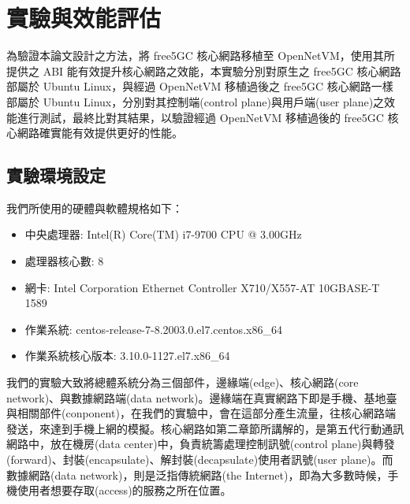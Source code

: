 \chapter{實驗與效能評估}
\label{chapter:evaluation}

為驗證本論文設計之方法，將 free5GC 核心網路移植至 OpenNetVM，使用其所提供之 ABI 能有效提升核心網路之效能，本實驗分別對原生之 free5GC 核心網路部屬於 Ubuntu Linux，與經過 OpenNetVM 移植過後之 free5GC 核心網路一樣部屬於 Ubuntu Linux，分別對其控制端(control plane)與用戶端(user plane)之效能進行測試，最終比對其結果，以驗證經過 OpenNetVM 移植過後的 free5GC 核心網路確實能有效提供更好的性能。

\section{實驗環境設定}
\label{sec:evaluation}

我們所使用的硬體與軟體規格如下：
\begin{itemize}
\item 中央處理器: Intel(R) Core(TM) i7-9700 CPU @ 3.00GHz
\item 處理器核心數: 8
\item 網卡: Intel Corporation Ethernet Controller X710/X557-AT 10GBASE-T 1589
\item 作業系統: centos-release-7-8.2003.0.el7.centos.x86\_64
\item 作業系統核心版本: 3.10.0-1127.el7.x86\_64
\end{itemize}

我們的實驗大致將總體系統分為三個部件，邊緣端(edge)、核心網路(core network)、與數據網路端(data network)。邊緣端在真實網路下即是手機、基地臺與相關部件(conponent)，在我們的實驗中，會在這部分產生流量，往核心網路端發送，來達到手機上網的模擬。核心網路如第二章節所講解的，是第五代行動通訊網路中，放在機房(data center)中，負責統籌處理控制訊號(control plane)與轉發(forward)、封裝(encapsulate)、解封裝(decapsulate)使用者訊號(user plane)。而數據網路(data network)，則是泛指傳統網路(the Internet)，即為大多數時候，手機使用者想要存取(access)的服務之所在位置。

